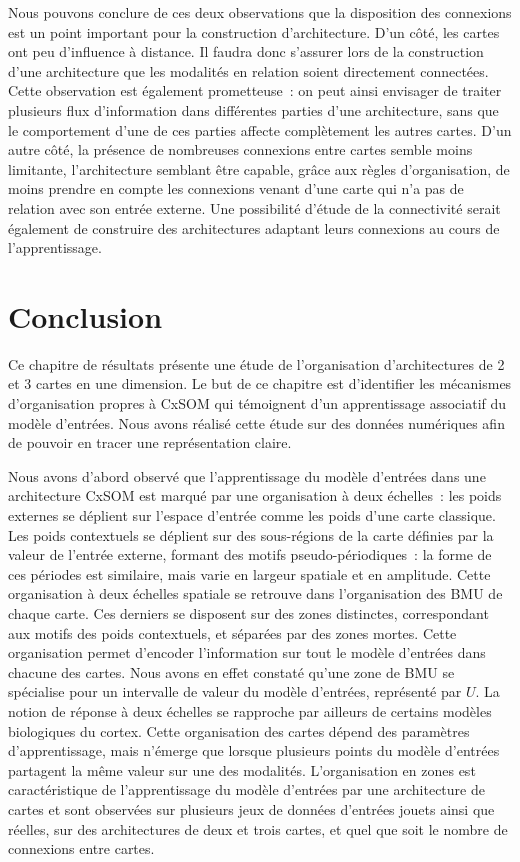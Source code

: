 \documentclass[../main]{subfiles}
\begin{document}
Nous pouvons conclure de ces deux observations que la disposition des connexions est un point important pour la construction d'architecture.
D'un côté, les cartes ont peu d'influence à distance. Il faudra donc s'assurer lors de la construction d'une architecture que les modalités en relation soient directement connectées. Cette observation est également prometteuse~: on peut ainsi envisager de traiter plusieurs flux d'information dans différentes parties d'une architecture, sans que le comportement d'une de ces parties affecte complètement les autres cartes.
D'un autre côté, la présence de nombreuses connexions entre cartes semble moins limitante, l'architecture semblant être capable, grâce aux règles d'organisation, de moins prendre en compte les connexions venant d'une carte qui n'a pas de relation avec son entrée externe. 
Une possibilité d'étude de la connectivité serait également de construire des architectures adaptant leurs connexions au cours de l'apprentissage.

\section{Conclusion}

Ce chapitre de résultats présente une étude de l'organisation d'architectures de 2 et 3 cartes en une dimension.
Le but de ce chapitre est d'identifier les mécanismes d'organisation propres à CxSOM qui témoignent d'un apprentissage associatif du modèle d'entrées.
Nous avons réalisé cette étude sur des données numériques afin de pouvoir en tracer une représentation claire.

Nous avons d'abord observé que l'apprentissage du modèle d'entrées dans une architecture CxSOM est marqué par une organisation à deux échelles~: les poids externes se déplient sur l'espace d'entrée comme les poids d'une carte classique. Les poids contextuels se déplient sur des sous-régions de la carte définies par la valeur de l'entrée externe, formant des motifs pseudo-périodiques~: la forme de ces périodes est similaire, mais varie en largeur spatiale et en amplitude. 
Cette organisation à deux échelles spatiale se retrouve dans l'organisation des BMU de chaque carte.
Ces derniers se disposent sur des zones distinctes, correspondant aux motifs des poids contextuels, et séparées par des zones mortes.
Cette organisation permet d'encoder l'information sur tout le modèle d'entrées dans chacune des cartes. Nous avons en effet constaté qu'une zone de BMU se spécialise pour un intervalle de valeur du modèle d'entrées, représenté par $U$. La notion de réponse à deux échelles se rapproche par ailleurs de certains modèles biologiques du cortex.
Cette organisation des cartes dépend des paramètres d'apprentissage, mais n'émerge que lorsque plusieurs points du modèle d'entrées partagent la même valeur sur une des modalités.
L'organisation en zones est caractéristique de l'apprentissage du modèle d'entrées par une architecture de cartes et sont observées sur plusieurs jeux de données d'entrées jouets ainsi que réelles, sur des architectures de deux et trois cartes, et quel que soit le nombre de connexions entre cartes.
\end{document}
